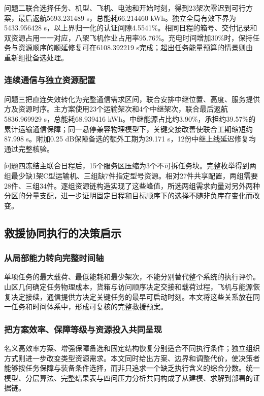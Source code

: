 \documentclass[withoutpreface,colorprint]{format}
\numberwithin{equation}{section}
\numberwithin{figure}{section}
\numberwithin{table}{section}
\begin{document}
问题二联合选择任务、机型、飞机、电池和开始时刻，得到23架次零迟到可行方案，最后返航5693.231489 s，总能耗66.214460 kWh。独立全局有效下界为5433.956428 s，以上界归一化的认证间隙4.5541\%。相同日程的箱号、交付记录和双资源占用一一对应，八架飞机作业占用率95.76\%。充电时间增加30\%时，保持任务与资源顺序的顺延修复可在6108.392219 s完成；超出任务能量预算的情景则由重新组批备选处理。

\subsubsection{连续通信与独立资源配置}
问题三把直连失效转化为完整通信需求区间，联合安排中继位置、高度、服务提供方及资源时序。主方案使用23个运输架次和4个中继架次，联合最后返航5836.969929 s，总能耗68.939416 kWh。中继能源占比约3.90\%，承担约39.57\%的累计运输通信保障；同一悬停兼容物理模型下，关键交接改善使联合工期缩短约87.998 s。附加0.25 dB保障备选的额外工期为29.171 s，12份中继上线延迟修复均通过完整核验。

问题四冻结主联合日程后，15个服务区压缩为3个不可拆任务块。完整枚举得到两组最少缺1架C型运输机、三组缺7件指定型号资源。相对27件共享配置，两组需要28件、三组34件。逐组资源链构造实现了这些峰值，所选两组需求向量对另外两种分区的分量支配，进一步证明固定日程和目标顺序下的选择不随非负库存变化而改变。

\subsection{救援协同执行的决策启示}
\subsubsection{从局部能力转向完整时间轴}
单项任务的最大载荷、最低能耗和最少架次，不能分别替代整个系统的执行评价。山区几何确定任务物理成本，货箱与访问顺序决定交接和载荷过程，飞机与能源恢复决定接续，通信提供方决定关键任务的最早可启动时刻。本文将这些关系放在同一任务和时间体系中，形成可复核的完整救援预案。

\subsubsection{把方案效率、保障等级与资源投入共同呈现}
名义高效率方案、增强保障备选和固定结构恢复分别适合不同执行条件；独立组织方式则进一步改变类型资源需求。本文同时给出方案、边界和调整代价，使决策者能够按任务保障与装备条件选择，而非只追求一个缺乏执行含义的综合分数。统一模型、分层算法、完整结果表与四问压力分析共同构成了从建模、求解到部署的证据链。
\end{document}
